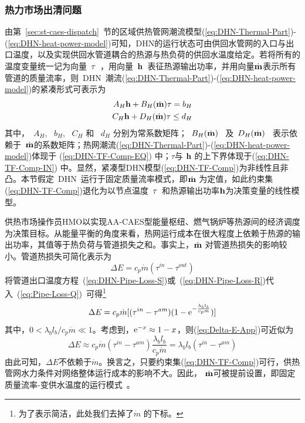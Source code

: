\subsubsection{热力市场出清问题}

由第~\ref{sec:st-caes-dispatch}~节的区域供热管网潮流模型(\ref{eq:DHN-Thermal-Part})-(\ref{eq:DHN-heat-power-model})可知，DHN的运行状态可由供回水管网的入口与出口温度，以及实现供回水管道耦合的热源与热负荷的供回水温度给定。若将所有的温度变量统一记为向量~$\rm \tau$~，用向量~$\bf h$~表征热源输出功率，并用向量$\dot {\bf m}$表示所有管道的质量流率，则~DHN~潮流(\ref{eq:DHN-Thermal-Part})-(\ref{eq:DHN-heat-power-model})的紧凑形式可表示为
\begin{subequations}
\label{eq:DHN-TF-Comp}
\begin{align}
A_H{\bf h} + B_H(\dot {\bf m})\tau = b_H\label{eq:DHN-TF-Comp-EQ}\\
C_H{\bf h} + D_H(\dot {\bf m})\tau \le d_H \label{eq:DHN-TF-Comp-IN}
\end{align}
\end{subequations}
其中，~$A_H$, ~$b_H$, ~$C_H$ 和 ~$d_H$ 分别为常系数矩阵；~$B_H(\dot {\bf m})$~ 及~$D_H(\dot {\bf m})$~ 表示依赖于~$\dot {\bf m}$的系数矩阵；热网潮流(\ref{eq:DHN-Thermal-Part})-(\ref{eq:DHN-heat-power-model})体现于 (\ref{eq:DHN-TF-Comp-EQ}) 中；$\tau$与 $\bf h$ 的上下界体现于(\ref{eq:DHN-TF-Comp-IN}) 中。显然，紧凑型DHN模型(\ref{eq:DHN-TF-Comp})为非线性且非凸。本节假定~DHN~运行于固定质量流率模式，即$\dot {\bf m}$ 为定值，如此约束集(\ref{eq:DHN-TF-Comp})退化为以节点温度~$\rm \tau$~和热源输出功率${\bf h}$为决策变量的线性模型。

供热市场操作员HMO以实现AA-CAES型能量枢纽、燃气锅炉等热源间的经济调度为决策目标。从能量平衡的角度来看，热网运行成本在很大程度上依赖于热源的输出功率，其值等于热负荷与管道损失之和。事实上，$\dot {\bf m}$ 对管道热损失的影响较小。管道热损失可简化表示为
\begin{equation}
\label{eq:Pipe-Loss-Q}
\Delta E = c_p \dot m (\tau^{in}-\tau^{out})
\end{equation}
将管道出口温度方程~(\ref{eq:DHN-Pipe-Loss-S})或~(\ref{eq:DHN-Pipe-Loss-R})代入~(\ref{eq:Pipe-Loss-Q})~可得\footnote{为了表示简洁，此处我们去掉了$\dot m$ 的下标。}
\begin{equation}
\label{eq:Delta-E-App}
\Delta E = c_p \dot m [ (\tau^{in}- \tau^{am})(1-{\rm e}^{-\frac{\lambda_b l_b}{c_p \dot m}})]
\end{equation}
其中，$0 < \lambda_b l_b/c_p \dot m \ll 1$。考虑到，${\rm e}^{-x} \approx 1-x$，则(\ref{eq:Delta-E-App})可近似为
\begin{equation}
\Delta E \approx c_p \dot m (\tau^{in}-\tau^{am}) \frac{\lambda_b l_b}{c_p \dot m} = \lambda_b l_b(\tau^{in} - \tau^{am})
\end{equation}
由此可知，$\Delta E$不依赖于$\dot m$。换言之，只要约束集(\ref{eq:DHN-TF-Comp})可行，供热管网水力条件对网络整体运行成本的影响不大。因此， $\dot {\bf m}$可被提前设置，即固定质量流率-变供水温度的运行模式~\cite{DHN-CFVT-2013}。

